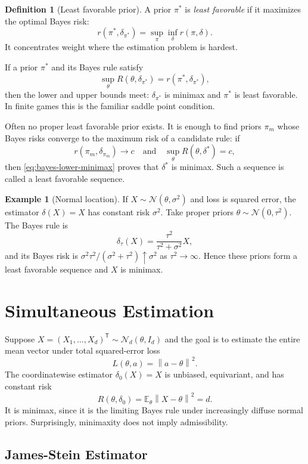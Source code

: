 \documentclass[12pt,oneside]{book}
\numberwithin{equation}{section}
\theoremstyle{definition}
\newtheorem{definition}{Definition}[section]
\newtheorem{example}{Example}[section]
\theoremstyle{plain}
\theoremstyle{remark}
\newcommand{\E}{\mathbb{E}}
\newcommand{\norm}[1]{\left\lVert #1 \right\rVert}
\newcommand{\Normal}{\mathcal{N}}
\begin{document}
\begin{definition}[Least favorable prior]
A prior $\pi^*$ is \emph{least favorable} if it maximizes the optimal Bayes
risk:
\[
    r(\pi^*,\delta_{\pi^*})
    =\sup_\pi\inf_\delta r(\pi,\delta).
\]
It concentrates weight where the estimation problem is hardest.
\end{definition}

If a prior $\pi^*$ and its Bayes rule satisfy
\[
    \sup_\theta R(\theta,\delta_{\pi^*})
    =r(\pi^*,\delta_{\pi^*}),
\]
then the lower and upper bounds meet: $\delta_{\pi^*}$ is minimax and
$\pi^*$ is least favorable.  In finite games this is the familiar saddle
point condition.

Often no proper least favorable prior exists.  It is enough to find priors
$\pi_m$ whose Bayes risks converge to the maximum risk of a candidate rule:
if
\[
    r(\pi_m,\delta_{\pi_m})\longrightarrow c
    \quad\text{and}\quad
    \sup_\theta R(\theta,\delta^*)=c,
\]
then \eqref{eq:bayes-lower-minimax} proves that $\delta^*$ is minimax.  Such a
sequence is called a least favorable sequence.

\begin{example}[Normal location]
If $X\sim\Normal(\theta,\sigma^2)$ and loss is squared error, the estimator
$\delta(X)=X$ has constant risk $\sigma^2$.  Take proper priors
$\theta\sim\Normal(0,\tau^2)$.  The Bayes rule is
\[
    \delta_\tau(X)=\frac{\tau^2}{\tau^2+\sigma^2}X,
\]
and its Bayes risk is
$\sigma^2\tau^2/(\sigma^2+\tau^2)\uparrow\sigma^2$ as $\tau^2\to\infty$.
Hence these priors form a least favorable sequence and $X$ is minimax.
\end{example}

\section{Simultaneous Estimation}

Suppose $X=(X_1,\ldots,X_d)^\mathsf T\sim\Normal_d(\theta,I_d)$ and the goal is
to estimate the entire mean vector under total squared-error loss
\[
    L(\theta,a)=\norm{a-\theta}^2.
\]
The coordinatewise estimator $\delta_0(X)=X$ is unbiased, equivariant, and
has constant risk
\[
    R(\theta,\delta_0)=\E_\theta\norm{X-\theta}^2=d.
\]
It is minimax, since it is the limiting Bayes rule under increasingly diffuse
normal priors.  Surprisingly, minimaxity does not imply admissibility.

\subsection{James-Stein Estimator}
\end{document}

